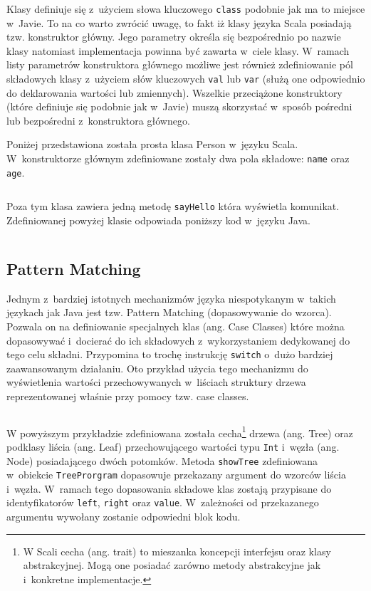 \documentclass[brudnopis]{xmgr}
\begin{document}
\inputminted{scala}{listings/scala/functions-example.scala}

Klasy definiuje się z~użyciem słowa kluczowego \texttt{class} podobnie jak ma to miejsce w~Javie. To na co warto zwrócić uwagę, to fakt iż klasy języka Scala posiadają tzw. konstruktor główny. Jego parametry określa się bezpośrednio po nazwie klasy natomiast implementacja powinna być zawarta w~ciele klasy. W~ramach listy parametrów konstruktora głównego możliwe jest również zdefiniowanie pól składowych klasy z~użyciem słów kluczowych \texttt{val} lub \texttt{var} (służą one odpowiednio do deklarowania wartości lub zmiennych). Wszelkie przeciążone konstruktory (które definiuje się podobnie jak w~Javie) muszą skorzystać w~sposób pośredni lub bezpośredni z~konstruktora głównego.

Poniżej przedstawiona została prosta klasa Person w~języku Scala. W~konstruktorze głównym zdefiniowane zostały dwa pola składowe: \texttt{name} oraz \texttt{age}.

\inputminted{scala}{listings/scala/simple-class-person.scala}

Poza tym klasa zawiera jedną metodę \texttt{sayHello} która wyświetla komunikat.
Zdefiniowanej powyżej klasie odpowiada poniższy kod w~języku Java.

\inputminted{scala}{listings/java/simple-class-person.java}

\subsection{Pattern Matching}

Jednym z~bardziej istotnych mechanizmów języka niespotykanym w~takich językach jak Java jest tzw. Pattern Matching (dopasowywanie do wzorca). Pozwala on na definiowanie specjalnych klas (ang. Case Classes) które można dopasowywać i~docierać do ich składowych z~wykorzystaniem dedykowanej do tego celu składni. Przypomina to trochę instrukcję \texttt{switch} o~dużo bardziej zaawansowanym działaniu. Oto przykład użycia tego mechanizmu do wyświetlenia wartości przechowywanych w~liściach struktury drzewa reprezentowanej właśnie przy pomocy tzw. case classes.

\inputminted{scala}{listings/scala/pattern-matching-trees.scala}

W powyższym przykładzie zdefiniowana została cecha\footnote{W Scali cecha (ang. trait) to mieszanka koncepcji interfejsu oraz klasy abstrakcyjnej. Mogą one posiadać zarówno metody abstrakcyjne jak i~konkretne implementacje.} drzewa (ang. Tree) oraz podklasy liścia (ang. Leaf) przechowującego wartości typu \texttt{Int} i~węzła (ang. Node) posiadającego dwóch potomków. Metoda \texttt{showTree} zdefiniowana w~obiekcie \texttt{TreeProrgram} dopasowuje przekazany argument do wzorców liścia i~węzła. W~ramach tego dopasowania składowe klas zostają przypisane do identyfikatorów \texttt{left}, \texttt{right} oraz \texttt{value}. W~zależności od przekazanego argumentu wywołany zostanie odpowiedni blok kodu.
\end{document}
